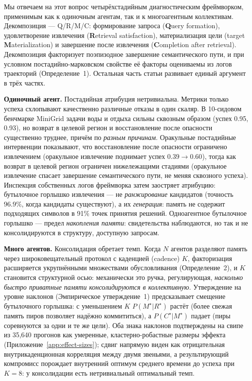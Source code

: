 \documentclass{article}
\begin{document}
Мы отвечаем на этот вопрос четырёхстадийным диагностическим фреймворком,
применимым как к одиночным агентам, так и к многоагентным коллективам.
Декомпозиция --- Q/R/M/C: формирование запроса (\textbf{Q}uery formation), удовлетворение
извлечения (\textbf{R}etrieval satisfaction), материализация цели (target \textbf{M}aterialization) и завершение
после извлечения (\textbf{C}ompletion after retrieval). Декомпозиция факторизует поэпизодное завершение семантического
пути, и при условном постадийно-марковском свойстве её факторы
оцениваемы из логов траекторий (Определение~1).
Остальная часть статьи развивает единый аргумент в трёх частях.

\textbf{Одиночный агент.} Постадийная атрибуция нетривиальна.
Метрики только успеха схлопывают качественно различные отказы в
один скаляр. В 10-сидовом бенчмарке MiniGrid задачи воды и отдыха
сильны сквозным образом (успех 0.95, 0.93), но возврат в целевой регион и
восстановление после опасности существенно труднее, причём по \emph{разным
причинам}. Оракульные постадийные интервенции показывают, что восстановление после опасности
ограничено извлечением (оракульное извлечение поднимает успех $0.39 \to 0.60$),
тогда как возврат в целевой регион ограничен нижележащими стадиями (оракульное извлечение
спасает завершение семантического пути, не меняя сквозного успеха).
Инспекция собственных логов фреймворка затем заостряет атрибуцию:
бутылочное горлышко извлечения --- не \emph{ранжирование} кандидатов (точность
$96.9\%$, когда кандидаты существуют), а их \emph{генерация}:
память не содержит подходящих символов в 91\% точек принятия решений.
Одноагентное бутылочное горлышко --- предел \emph{накопления памяти}:
свидетельства наблюдаются, но так и не консолидируются в структуру, доступную запросам.

\textbf{Много агентов.} Консолидация обретает темп.
Когда $N$ агентов разделяют память через широковещательный протокол с каденцией (cadence)
$K$, факторизация расширяется укрупнёнными множествами обусловливания
(Определение~2), и $K$ становится структурной осью: механически это
ручка, регулирующая, \emph{насколько быстро приватные памяти консолидируются
в коллективную}. Утверждение на уровне наклонов
(Эмпирическое утверждение~1) предсказывает смещение бутылочного горлышка: с уменьшением $K$
$P(M^\star|R^\star)$ растёт (более свежая память пиров позволяет
надёжно коммититься), а $P(C^\star|M^\star)$ падает (пиры соревнуются за
одни и те же цели). Оба знака наклонов подтверждены на свипе из 35{,}640 прогонов
как умеренные, кластерно-робастные размеры эффекта (Приложение~\ref{app:effect-sizes}); сдвиг напрямую виден как отрицательная
внутрикаденционная корреляция между двумя звеньями, а результирующий
компромисс порождает внутренний оптимум среднего времени до успеха при
$K\!=\!8$: у консолидации есть нетривиальный оптимальный темп.
\end{document}
